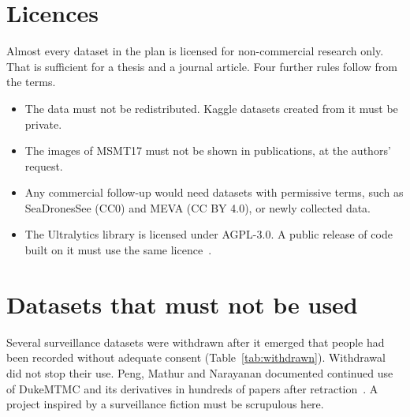 \section{Licences}
\label{sec:licences}

Almost every dataset in the plan is licensed for non-commercial research
only. That is sufficient for a thesis and a journal article. Four further
rules follow from the terms.
\begin{itemize}
  \item The data must not be redistributed. Kaggle datasets created from it
        must be private.
  \item The images of MSMT17 must not be shown in publications, at the
        authors' request.
  \item Any commercial follow-up would need datasets with permissive terms,
        such as SeaDronesSee (CC0) and MEVA (CC BY 4.0), or newly collected
        data.
  \item The Ultralytics library is licensed under AGPL-3.0. A public release
        of code built on it must use the same licence~\citep{yolo26_2026}.
\end{itemize}

\section{Datasets that must not be used}
\label{sec:withdrawn}

Several surveillance datasets were withdrawn after it emerged that people
had been recorded without adequate consent (Table~\ref{tab:withdrawn}).
Withdrawal did not stop their use. Peng, Mathur and Narayanan documented
continued use of DukeMTMC and its derivatives in hundreds of papers after
retraction~\citep{peng2021stewardship}. A project inspired by a surveillance
fiction must be scrupulous here.

